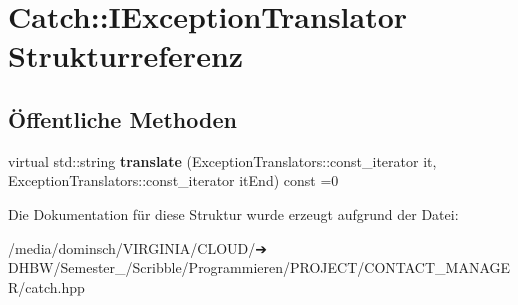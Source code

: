 \hypertarget{structCatch_1_1IExceptionTranslator}{}\section{Catch\+:\+:I\+Exception\+Translator Strukturreferenz}
\label{structCatch_1_1IExceptionTranslator}
\subsection*{Öffentliche Methoden}
\begin{DoxyCompactItemize}
\item 
\mbox{\label{structCatch_1_1IExceptionTranslator_a2a554b96ed5ed411e7c796b6b42837a5}} 
virtual std\+::string {\bfseries translate} (Exception\+Translators\+::const\+\_\+iterator it, Exception\+Translators\+::const\+\_\+iterator it\+End) const =0
\end{DoxyCompactItemize}


Die Dokumentation für diese Struktur wurde erzeugt aufgrund der Datei\+:\begin{DoxyCompactItemize}
\item 
/media/dominsch/\+V\+I\+R\+G\+I\+N\+I\+A/\+C\+L\+O\+U\+D/➔ D\+H\+B\+W/\+Semester\+\_/\+Scribble/\+Programmieren/\+P\+R\+O\+J\+E\+C\+T/\+C\+O\+N\+T\+A\+C\+T\+\_\+\+M\+A\+N\+A\+G\+E\+R/catch.\+hpp\end{DoxyCompactItemize}
